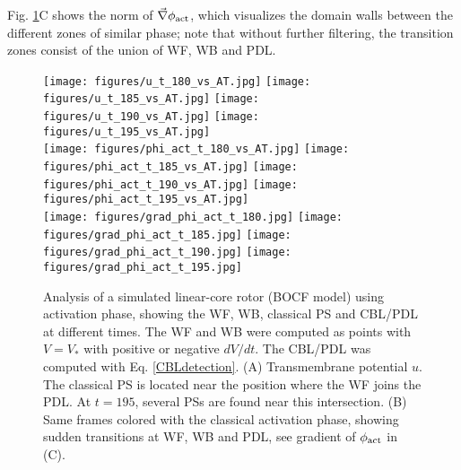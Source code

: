 \documentclass{article}
\newcommand{\phiact}{\ensuremath{\phi_{\rm act}}}
\newcommand{\VS}{V_*}
\newcommand{\figrevisit}{3.2cm}
\begin{document}


Fig. \ref{fig:S1S2revisited}C shows the norm of $\vec \nabla \phiact$, which visualizes the domain walls between the different zones of similar phase; note that without further filtering, the transition zones consist of the union of WF, WB and PDL.  

\begin{figure}
    \centering
    \texttt{[image: figures/u\_t\_180\_vs\_AT.jpg]}
    \texttt{[image: figures/u\_t\_185\_vs\_AT.jpg]}
    \texttt{[image: figures/u\_t\_190\_vs\_AT.jpg]}
    \texttt{[image: figures/u\_t\_195\_vs\_AT.jpg]} \\
    
       \texttt{[image: figures/phi\_act\_t\_180\_vs\_AT.jpg]}
    \texttt{[image: figures/phi\_act\_t\_185\_vs\_AT.jpg]}
    \texttt{[image: figures/phi\_act\_t\_190\_vs\_AT.jpg]}
    \texttt{[image: figures/phi\_act\_t\_195\_vs\_AT.jpg]} \\
    
    \texttt{[image: figures/grad\_phi\_act\_t\_180.jpg]}
    \texttt{[image: figures/grad\_phi\_act\_t\_185.jpg]}
    \texttt{[image: figures/grad\_phi\_act\_t\_190.jpg]}
    \texttt{[image: figures/grad\_phi\_act\_t\_195.jpg]}\\
        \caption{Analysis of a simulated linear-core rotor (BOCF model) using activation phase, showing the WF, WB, classical PS and CBL/PDL at different times. The WF and WB were computed as points with $V=\VS$ with positive or negative $dV/dt$. The CBL/PDL was  computed with Eq. \eqref{CBLdetection}.
        (A) Transmembrane potential $u$. The classical PS is located near the position where the WF joins the PDL. At $t=195$, several PSs are found near this intersection.  
        (B) Same frames colored with the classical activation phase, showing sudden transitions at WF, WB and PDL, see gradient of $\phiact$ in (C). }
    \label{fig:S1S2revisited}
\end{figure}
\end{document}
